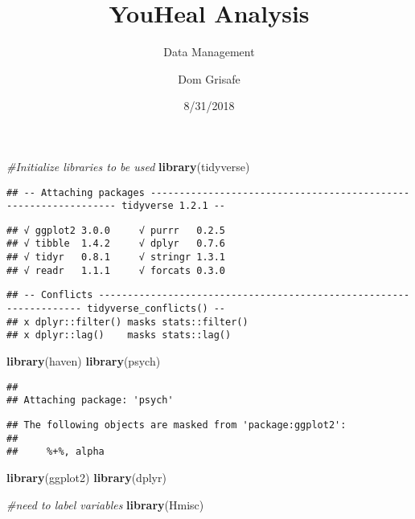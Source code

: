 \documentclass[]{article}
\title{YouHeal Analysis}
\subtitle{Data Management}
\author{Dom Grisafe}
\date{8/31/2018}
\newenvironment{Shaded}{\begin{snugshade}}{\end{snugshade}}
\newcommand{\KeywordTok}[1]{\textcolor[rgb]{0.13,0.29,0.53}{\textbf{#1}}}
\newcommand{\CommentTok}[1]{\textcolor[rgb]{0.56,0.35,0.01}{\textit{#1}}}
\newcommand{\NormalTok}[1]{#1}
\begin{document}
\maketitle

\begin{Shaded}
\begin{Highlighting}[]
\CommentTok{#Initialize libraries to be used}
\KeywordTok{library}\NormalTok{(tidyverse)}
\end{Highlighting}
\end{Shaded}

\begin{verbatim}
## -- Attaching packages ---------------------------------------------------------------- tidyverse 1.2.1 --
\end{verbatim}

\begin{verbatim}
## √ ggplot2 3.0.0     √ purrr   0.2.5
## √ tibble  1.4.2     √ dplyr   0.7.6
## √ tidyr   0.8.1     √ stringr 1.3.1
## √ readr   1.1.1     √ forcats 0.3.0
\end{verbatim}

\begin{verbatim}
## -- Conflicts ------------------------------------------------------------------- tidyverse_conflicts() --
## x dplyr::filter() masks stats::filter()
## x dplyr::lag()    masks stats::lag()
\end{verbatim}

\begin{Shaded}
\begin{Highlighting}[]
\KeywordTok{library}\NormalTok{(haven)}
\KeywordTok{library}\NormalTok{(psych)}
\end{Highlighting}
\end{Shaded}

\begin{verbatim}
## 
## Attaching package: 'psych'
\end{verbatim}

\begin{verbatim}
## The following objects are masked from 'package:ggplot2':
## 
##     %+%, alpha
\end{verbatim}

\begin{Shaded}
\begin{Highlighting}[]
\KeywordTok{library}\NormalTok{(ggplot2)}
\KeywordTok{library}\NormalTok{(dplyr)}

\CommentTok{#need to label variables}
\KeywordTok{library}\NormalTok{(Hmisc)}
\end{Highlighting}
\end{Shaded}
\end{document}
